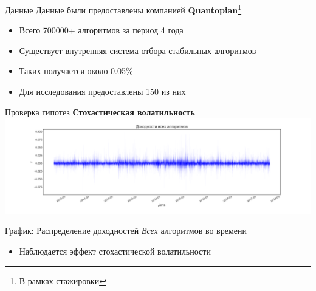 \documentclass[14pt]{beamer}
\begin{document}
\begin{frame}{Данные}
Данные были предоставлены компанией \textbf{Quantopian}\footnote{\vspace{.5em}В рамках стажировки}
\begin{itemize}
	\item Всего 700000+ алгоритмов за период 4 года
	\item Существует внутренняя система отбора стабильных алгоритмов
	\item Таких получается около 0.05\%
	\item Для исследования предоставлены 150 из них
\end{itemize}
\end{frame}

\begin{frame}{Проверка гипотез}
\textbf{Стохастическая волатильность}
\includegraphics[width=\linewidth]{returns-all}

График: Распределение доходностей \textit{Всех} алгоритмов во времени
\begin{itemize}
	\item Наблюдается эффект стохастической волатильности
\end{itemize}
\end{frame}
\end{document}

